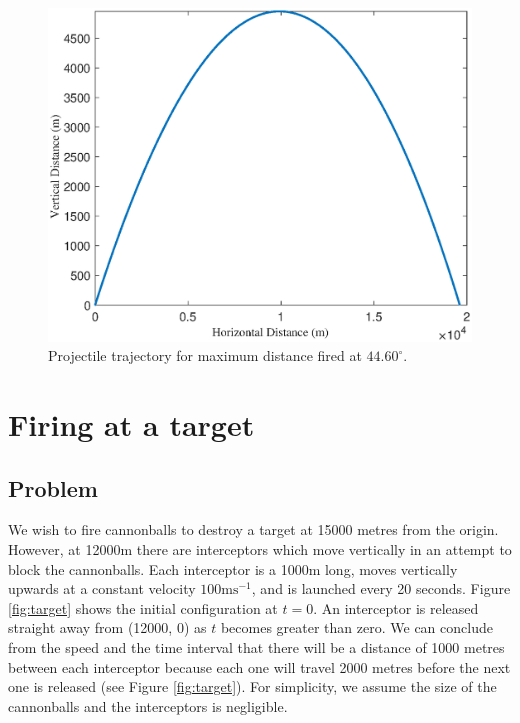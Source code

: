 \documentclass[11pt]{report}
\begin{document}
\begin{figure}[h]
	\centering
  	\includegraphics[scale=0.48]{assets/max_dist_plot.eps}
  	\caption{Projectile trajectory for maximum distance fired at $44.60^{\circ}$.}
  	\label{fig:plot}
\end{figure}

\chapter{Firing at a target}
\section*{Problem}
We wish to fire cannonballs to destroy a target at 15000 metres from the origin. However, at 12000m there are interceptors which move vertically in an attempt to block the cannonballs. Each interceptor is a 1000m long, moves vertically upwards at a constant velocity $100\text{ms}^{-1}$, and is launched every 20 seconds. Figure \ref{fig:target} shows the initial configuration at $t=0$. An interceptor is released straight away from (12000, 0) as $t$ becomes greater than zero. We can conclude from the speed and the time interval that there will be a distance of 1000 metres between each interceptor because each one will travel 2000 metres before the next one is released (see Figure \ref{fig:target}). For simplicity, we assume the size of the cannonballs and the interceptors is negligible.\\
\end{document}
